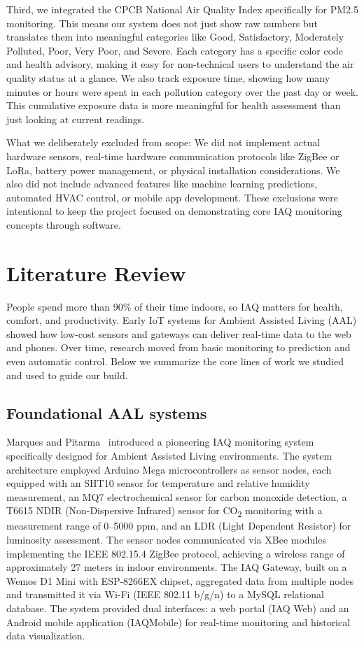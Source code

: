\documentclass[12pt]{report}
\begin{document}
Third, we integrated the CPCB National Air Quality Index specifically for PM2.5 monitoring. This means our system does not just show raw numbers but translates them into meaningful categories like Good, Satisfactory, Moderately Polluted, Poor, Very Poor, and Severe. Each category has a specific color code and health advisory, making it easy for non-technical users to understand the air quality status at a glance. We also track exposure time, showing how many minutes or hours were spent in each pollution category over the past day or week. This cumulative exposure data is more meaningful for health assessment than just looking at current readings.

What we deliberately excluded from scope: We did not implement actual hardware sensors, real-time hardware communication protocols like ZigBee or LoRa, battery power management, or physical installation considerations. We also did not include advanced features like machine learning predictions, automated HVAC control, or mobile app development. These exclusions were intentional to keep the project focused on demonstrating core IAQ monitoring concepts through software.

\section{Literature Review}
People spend more than 90\% of their time indoors, so IAQ matters for health, comfort, and productivity. Early IoT systems for Ambient Assisted Living (AAL) showed how low-cost sensors and gateways can deliver real-time data to the web and phones. Over time, research moved from basic monitoring to prediction and even automatic control. Below we summarize the core lines of work we studied and used to guide our build.

\subsection{Foundational AAL systems}
Marques and Pitarma~\cite{marques2016} introduced a pioneering IAQ monitoring system specifically designed for Ambient Assisted Living environments. The system architecture employed Arduino Mega microcontrollers as sensor nodes, each equipped with an SHT10 sensor for temperature and relative humidity measurement, an MQ7 electrochemical sensor for carbon monoxide detection, a T6615 NDIR (Non-Dispersive Infrared) sensor for CO\textsubscript{2} monitoring with a measurement range of 0--5000 ppm, and an LDR (Light Dependent Resistor) for luminosity assessment. The sensor nodes communicated via XBee modules implementing the IEEE 802.15.4 ZigBee protocol, achieving a wireless range of approximately 27 meters in indoor environments. The IAQ Gateway, built on a Wemos D1 Mini with ESP-8266EX chipset, aggregated data from multiple nodes and transmitted it via Wi-Fi (IEEE 802.11 b/g/n) to a MySQL relational database. The system provided dual interfaces: a web portal (IAQ Web) and an Android mobile application (IAQMobile) for real-time monitoring and historical data visualization.
\end{document}
